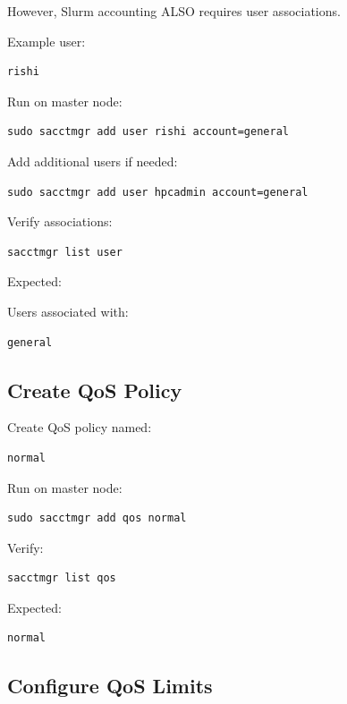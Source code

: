 \documentclass[11pt]{article}
\begin{document}
However, Slurm accounting ALSO requires user associations.

Example user:

\begin{verbatim}
rishi
\end{verbatim}

Run on master node:

\begin{verbatim}
sudo sacctmgr add user rishi account=general
\end{verbatim}

Add additional users if needed:

\begin{verbatim}
sudo sacctmgr add user hpcadmin account=general
\end{verbatim}

Verify associations:

\begin{verbatim}
sacctmgr list user
\end{verbatim}

Expected:

Users associated with:

\begin{verbatim}
general
\end{verbatim}
\subsection{Create QoS Policy}
\label{sec:orgf736e7d}

Create QoS policy named:

\begin{verbatim}
normal
\end{verbatim}

Run on master node:

\begin{verbatim}
sudo sacctmgr add qos normal
\end{verbatim}

Verify:

\begin{verbatim}
sacctmgr list qos
\end{verbatim}

Expected:

\begin{verbatim}
normal
\end{verbatim}
\subsection{Configure QoS Limits}
\label{sec:org577e857}
\end{document}
